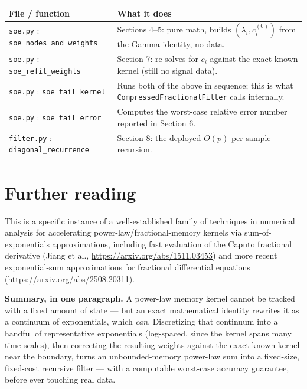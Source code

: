 \documentclass[11pt]{article}
\begin{document}
\begin{table}[h]
\centering
\small
\begin{tabularx}{\textwidth}{lX}
\toprule
File / function & What it does \\
\midrule
\texttt{soe.py} : \texttt{soe\_nodes\_and\_weights} & Sections 4--5: pure math, builds $(\lambda_i, c_i^{(0)})$ from the Gamma identity, no data. \\
\texttt{soe.py} : \texttt{soe\_refit\_weights} & Section 7: re-solves for $c_i$ against the exact known kernel (still no signal data). \\
\texttt{soe.py} : \texttt{soe\_tail\_kernel} & Runs both of the above in sequence; this is what \texttt{CompressedFractionalFilter} calls internally. \\
\texttt{soe.py} : \texttt{soe\_tail\_error} & Computes the worst-case relative error number reported in Section 6. \\
\texttt{filter.py} : \texttt{diagonal\_recurrence} & Section 8: the deployed $O(p)$-per-sample recursion. \\
\bottomrule
\end{tabularx}
\end{table}

\section{Further reading}

This is a specific instance of a well-established family of techniques in numerical analysis for accelerating power-law/fractional-memory kernels via sum-of-exponentials approximations, including fast evaluation of the Caputo fractional derivative (Jiang et al., \url{https://arxiv.org/abs/1511.03453}) and more recent exponential-sum approximations for fractional differential equations (\url{https://arxiv.org/abs/2508.20311}).

\begin{recap}
\textbf{Summary, in one paragraph.} A power-law memory kernel cannot be tracked with a fixed amount of state --- but an exact mathematical identity rewrites it as a continuum of exponentials, which \emph{can}. Discretizing that continuum into a handful of representative exponentials (log-spaced, since the kernel spans many time scales), then correcting the resulting weights against the exact known kernel near the boundary, turns an unbounded-memory power-law sum into a fixed-size, fixed-cost recursive filter --- with a computable worst-case accuracy guarantee, before ever touching real data.
\end{recap}
\end{document}
